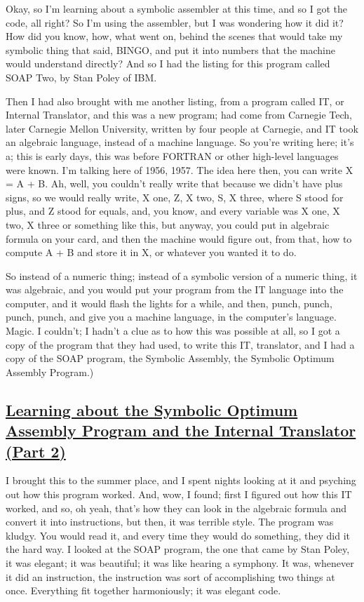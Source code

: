 \documentclass[]{article}
\begin{document}
Okay, so I'm learning about a symbolic assembler at this time, and so I
got the code, all right? So I'm using the assembler, but I was wondering
how it did it? How did you know, how, what went on, behind the scenes
that would take my symbolic thing that said, BINGO, and put it into
numbers that the machine would understand directly? And so I had the
listing for this program called SOAP Two, by Stan Poley of IBM.

Then I had also brought with me another listing, from a program called
IT, or Internal Translator, and this was a new program; had come from
Carnegie Tech, later Carnegie Mellon University, written by four people
at Carnegie, and IT took an algebraic language, instead of a machine
language. So you're writing here; it's a; this is early days, this was
before FORTRAN or other high-level languages were known. I'm talking
here of 1956, 1957. The idea here then, you can write X = A + B. Ah,
well, you couldn't really write that because we didn't have plus signs,
so we would really write, X one, Z, X two, S, X three, where S stood for
plus, and Z stood for equals, and, you know, and every variable was X
one, X two, X three or something like this, but anyway, you could put in
algebraic formula on your card, and then the machine would figure out,
from that, how to compute A + B and store it in X, or whatever you
wanted it to do.

So instead of a numeric thing; instead of a symbolic version of a
numeric thing, it was algebraic, and you would put your program from the
IT language into the computer, and it would flash the lights for a
while, and then, punch, punch, punch, punch, and give you a machine
language, in the computer's language. Magic. I couldn't; I hadn't a clue
as to how this was possible at all, so I got a copy of the program that
they had used, to write this IT, translator, and I had a copy of the
SOAP program, the Symbolic Assembly, the Symbolic Optimum Assembly
Program.)

\subsection{\texorpdfstring{\href{http://webofstories.com/play/17083}{Learning
about the Symbolic Optimum Assembly Program and the Internal Translator
(Part
2)}}{Learning about the Symbolic Optimum Assembly Program and the Internal Translator (Part 2)}}\label{learning-about-the-symbolic-optimum-assembly-program-and-the-internal-translator-part-2}

I brought this to the summer place, and I spent nights looking at it and
psyching out how this program worked. And, wow, I found; first I figured
out how this IT worked, and so, oh yeah, that's how they can look in the
algebraic formula and convert it into instructions, but then, it was
terrible style. The program was kludgy. You would read it, and every
time they would do something, they did it the hard way. I looked at the
SOAP program, the one that came by Stan Poley, it was elegant; it was
beautiful; it was like hearing a symphony. It was, whenever it did an
instruction, the instruction was sort of accomplishing two things at
once. Everything fit together harmoniously; it was elegant code.
\end{document}
